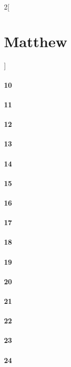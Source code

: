\documentclass{book}
\begin{document}
\begin{multicols}{2}[\part{Matthew}]
\subsection*{10}
\subsection*{11}
\subsection*{12}
\subsection*{13}
\subsection*{14}
\subsection*{15}
\subsection*{16}
\subsection*{17}
\subsection*{18}
\subsection*{19}
\subsection*{20}
\subsection*{21}
\subsection*{22}
\subsection*{23}
\subsection*{24}

\end{multicols}
\end{document}
